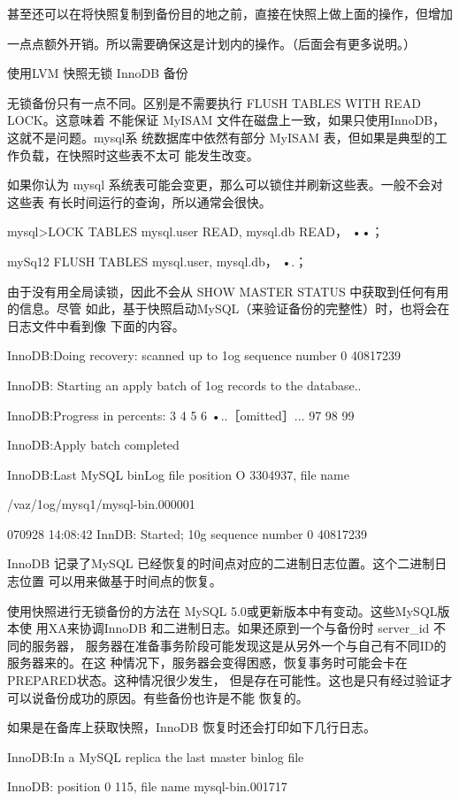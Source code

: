 甚至还可以在将快照复制到备份目的地之前，直接在快照上做上面的操作，但增加

一点点额外开销。所以需要确保这是计划内的操作。（后面会有更多说明。）

使用LVM 快照无锁 InnoDB 备份

无锁备份只有一点不同。区别是不需要执行 FLUSH TABLES WITH READ LOCK。这意味着
不能保证 MyISAM 文件在磁盘上一致，如果只使用InnoDB，这就不是问题。mysql系
统数据库中依然有部分 MyISAM 表，但如果是典型的工作负载，在快照时这些表不太可
能发生改变。

如果你认为 mysql 系统表可能会变更，那么可以锁住并刷新这些表。一般不会对这些表
有长时间运行的查询，所以通常会很快。

mysql>LOCK TABLES mysql.user READ, mysql.db READ， ••；

mySq12 FLUSH TABLES mysql.user, mysql.db， •.；

由于没有用全局读锁，因此不会从 SHOW MASTER STATUS 中获取到任何有用的信息。尽管
如此，基于快照启动MySQL（来验证备份的完整性）时，也将会在日志文件中看到像
下面的内容。

InnoDB:Doing recovery: scanned up to 1og sequence number 0 40817239

InnoDB: Starting an apply batch of 1og records to the database..

InnoDB:Progress in percents: 3 4 5 6 •..［omitted］... 97 98 99

InnoDB:Apply batch completed

InnoDB:Last MySQL binLog file position O 3304937, file name

/vaz/1og/mysq1/mysql-bin.000001

070928 14:08:42 InnDB: Started; 10g sequence number 0 40817239

InnoDB 记录了MySQL 已经恢复的时间点对应的二进制日志位置。这个二进制日志位置
可以用来做基于时间点的恢复。

使用快照进行无锁备份的方法在 MySQL 5.0或更新版本中有变动。这些MySQL版本使
用XA来协调InnoDB 和二进制日志。如果还原到一个与备份时 server\_id 不同的服务器，
服务器在准备事务阶段可能发现这是从另外一个与自己有不同ID的服务器来的。在这
种情况下，服务器会变得困惑，恢复事务时可能会卡在 PREPARED状态。这种情况很少发生，
但是存在可能性。这也是只有经过验证才可以说备份成功的原因。有些备份也许是不能
恢复的。

如果是在备库上获取快照，InnoDB 恢复时还会打印如下几行日志。

InnoDB:In a MySQL replica the last master binlog file

InnoDB: position 0 115, file name mysql-bin.001717

